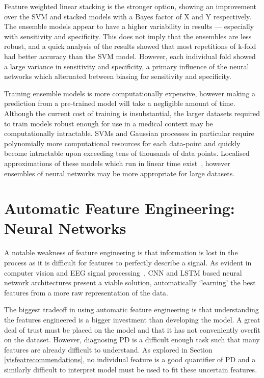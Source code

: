\documentclass[12pt, twoside]{book}
\begin{document}
Feature weighted linear stacking is the stronger option, showing an improvement over the SVM and stacked models with a Bayes factor of X and Y respectively. The ensemble models appear to have a higher variability in results --- especially with sensitivity and specificity. This does not imply that the ensembles are less robust, and a quick analysis of the results showed that most repetitions of k-fold had better accuracy than the SVM model. However, each individual fold showed a large variance in sensitivity and specificity, a primary influence of the neural networks which alternated between biasing for sensitivity and specificity. 

Training ensemble models is more computationally expensive, however making a prediction from a pre-trained model will take a negligible amount of time. Although the current cost of training is insubstantial, the larger datasets required to train models robust enough for use in a medical context may be computationally intractable. SVMs and Gaussian processes in particular require polynomially more computational resources for each data-point and quickly become intractable upon exceeding tens of thousands of data points. Localised approximations of these models which run in linear time exist~\cite{coresvm}, however ensembles of neural networks may be more appropriate for large datasets.



\section{Automatic Feature Engineering: Neural Networks}
\label{automaticfeatureengineering}
A notable weakness of feature engineering is that information is lost in the process as it is difficult for features to perfectly describe a signal. As evident in computer vision and EEG signal processing~\cite{bashivan2015learning}, CNN and LSTM based neural network architectures present a viable solution, automatically `learning' the best features from a more raw representation of the data. 

The biggest tradeoff in using automatic feature engineering is that understanding the features engineered is a bigger investment than developing the model. A great deal of trust must be placed on the model and that it has not conveniently overfit on the dataset. However, diagnosing PD is a difficult enough task such that many features are already difficult to understand. As explored in Section \ref{visfeatrecommendations}, no individual feature is a good quantifier of PD and a similarly difficult to interpret model must be used to fit these uncertain features.
\end{document}
